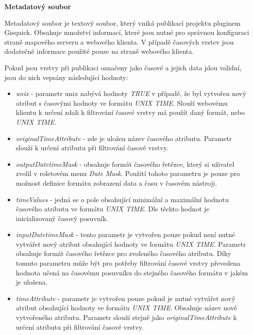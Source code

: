 
\bigskip
\noindent
\textbf{Metadatový soubor}

Metadatový soubor je textový soubor, který vniká publikací projektu pluginem Gisquick. Obsahuje množství informací, které jsou nutné pro správnou konfiguraci straně mapového serveru a webového klienta. V případě časových vrstev jsou dodatečné informace použité pouze na straně webového klienta. 

Pokud jsou vrstvy při publikaci označeny jako časové a jejich data jdou validní, jsou do nich vepsány následující hodnoty:

\begin{itemize}
	\item\textit{unix} - parametr unix nabývá hodnoty \textit{TRUE} v případě, že byl vytvořen nový atribut s časovými hodnoty ve formátu \textit{UNIX TIME}. Slouží webovému klientu k určení zdali k filtrování časové vrstvy má použít daný formát, nebo \textit{UNIX TIME}.
	\item\textit{originalTimeAttribute} - zde je uložen název časového atributu. Parametr slouží k určení atributu při filtrování časové vrstvy. 
	\item\textit{outputDatetimeMask} - obsahuje formát časového řetězce, který si uživatel zvolil v roletovém menu \textit{Date Mask}. Použití tohoto parametru je pouze pro možnost definice formátu zobrazení data a času v časovém nástroji.
	\item\textit{timeValues} - jedná se o pole obsahující minimální a maximální hodnotu časového atributu ve formátu \textit{UNIX TIME}. Dle těchto hodnot je inicializovaný časový posuvník. 
	\item\textit{inputDatetimeMask} - tento parametr je vytvořen pouze pokud není nutné vytvářet nový atribut obsahující hodnoty ve formátu \textit{UNIX TIME}. Parametr obsahuje formát časového řetězce pro zvoleného časového atributu. Díky tomuto parametru může být pro potřeby filtrování časové vrstvy převedena hodnota učená na časovému posuvníku do stejného časového formátu v jakém je uložena. 
	\item\textit{timeAttribute} - parametr je vytvořen pouze pokud je nutné vytvářet nový atribut obsahující hodnoty ve formátu \textit{UNIX TIME}. Obsahuje název nově vytvořeného atributu. Parametr slouží stejně jako \textit{originalTimeAttribute} k určení atributu při filtrování časové vrstvy.  
\end{itemize}



